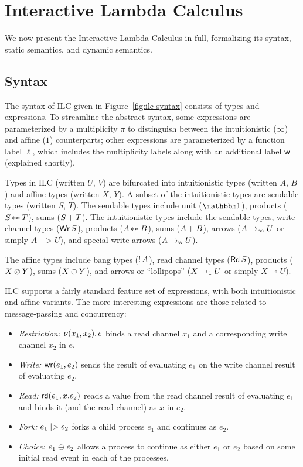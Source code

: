 
%



\section{Interactive Lambda Calculus}
\label{sec:ilc}

We now present the Interactive Lambda Calculus in full, formalizing its syntax,
static semantics, and dynamic semantics.

\subsection{Syntax}
\label{subsec:syntax}

The syntax of ILC given in Figure~\ref{fig:ilc-syntax} consists of types and
expressions. To streamline the abstract syntax, some expressions are
parameterized by a multiplicity $\pi$ to distinguish between the intuitionistic
($\infty$) and affine ($1$) counterparts; other expressions are parameterized by a
function label $\ell$, which includes the multiplicity labels along with an
additional label $\textsf{w}$ (explained shortly).

Types in ILC (written $U$, $V$) are bifurcated into intuitionistic types
(written $A$, $B$) and affine types (written $X$, $Y$). A subset of the
intuitionistic types are sendable types (written $S$, $T$). The sendable types
include unit ($\tyUnit$), products (${S}\, {**}_{}\, {T}$), sums
(${S}\, {+}_{}\, {T}$). The intuitionistic types include the sendable types, write
channel types ($\textnormal{\textsf{Wr}}\,S$), products (${A}\, {**}_{}\, {B}$), sums
(${A}\, {+}_{}\, {B}$), arrows (${A}\rightarrow_{\infty}{U}$ or simply $A -> U$), and special
write arrows (${A}\rightarrow_{\textsf{w}}{U}$).

The affine types include bang types (${!}\,{A}$), read channel types
($\textnormal{\textsf{Rd}}\,S$), products (${X}\otimes{Y}$), sums (${X}\oplus{Y}$), and arrows
or ``lollipops'' (${X}\rightarrow_{1}{U}$ or simply $X \multimap U$).

ILC supports a fairly standard feature set of expressions, with both
intuitionistic and affine variants. The more interesting expressions are those
related to message-passing and concurrency:
\begin{itemize}[leftmargin=*]
  \item \emph{Restriction:} $\nu(x_1, x_2).\,e$ binds a read channel $x_1$ and
    a corresponding write channel $x_2$ in $e$.
  \item \emph{Write:} $\textnormal{\textsf{wr}}\mathsf{(}{e_1},{e_2}\mathsf{)}$ sends the result of evaluating $e_1$ on
    the write channel result of evaluating $e_2$.
  \item \emph{Read:} $\textnormal{\textsf{rd}}\mathsf{(}{e_1},{x}.{e_2}\mathsf{)}$ reads a value from the read channel
    result of evaluating $e_1$ and binds it (and the read channel) as $x$ in
    $e_2$.
  \item \emph{Fork:} $e_1 \mathrel{|\rhd} e_2$ forks a child process $e_1$ and
    continues as $e_2$.
  \item \emph{Choice:} $e_1 \mathrel{\ominus} e_2$ allows a process to continue as
    either $e_1$ or $e_2$ based on some initial read event in each of the
    processes.
\end{itemize}

